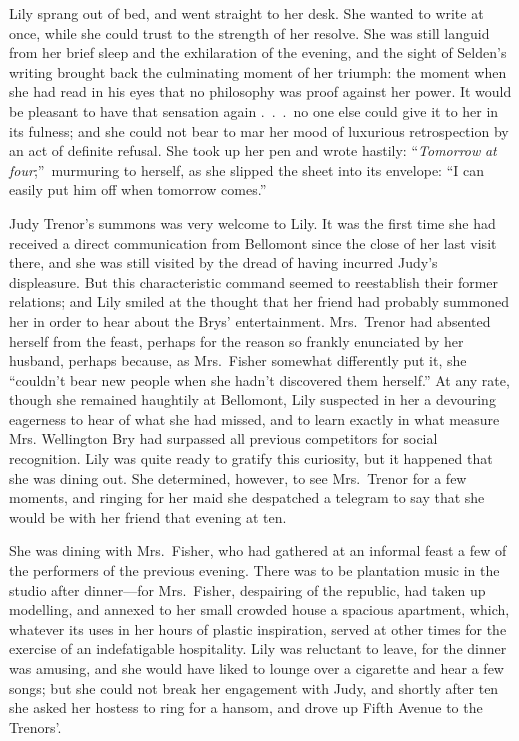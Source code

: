 \documentclass[12pt,a4paper]{book}
\begin{document}
Lily sprang out of bed, and went straight to her desk. She wanted
to write at once, while she could trust to the strength of her
resolve. She was still languid from her brief sleep and the
exhilaration of the evening, and the sight of Selden's writing
brought back the culminating moment of her triumph: the moment
when she had read in his eyes that no philosophy was proof
against her power. It would be pleasant to have that sensation
again .\ .\ .\ no one else could give it to her in its fulness; and
she could not bear to mar her mood of luxurious retrospection
by an act of definite refusal. She took up her pen and wrote hastily: 
``\textit{Tomorrow} \textit{at} \textit{four};''\ murmuring to herself, as she slipped the sheet
into its envelope: ``I can easily put him off when tomorrow comes.''







Judy Trenor's summons was very welcome to Lily. It was the first
time she had received a direct communication from Bellomont since
the close of her last visit there, and she was still visited by
the dread of having incurred Judy's displeasure. But this
characteristic command seemed to reestablish their former
relations; and Lily smiled at the thought that her friend had
probably summoned her in order to hear about the Brys'
entertainment. Mrs.\ Trenor had absented herself from the feast,
perhaps for the reason so frankly enunciated by her husband,
perhaps because, as Mrs.\ Fisher somewhat differently put it, she
``couldn't bear new people when she hadn't discovered them
herself.'' At any rate, though she remained haughtily at
Bellomont, Lily suspected in her a devouring eagerness to hear of
what she had missed, and to learn exactly in what measure Mrs.
Wellington Bry had surpassed all previous competitors for social
recognition. Lily was quite ready to gratify this curiosity, but
it happened that she was dining out. She determined, however, to
see Mrs.\ Trenor for a few moments, and ringing for her maid she
despatched a telegram to say that she would be with her friend
that evening at ten.





She was dining with Mrs.\ Fisher, who had gathered at an informal
feast a few of the performers of the previous evening. There was
to be plantation music in the studio after dinner---for Mrs.\ Fisher,
despairing of the republic, had taken up modelling, and annexed to
her small crowded house a spacious apartment, which, whatever its
uses in her hours of plastic inspiration, served at other times
for the exercise of an indefatigable hospitality. Lily was
reluctant to leave, for the dinner was amusing, and she would have
liked to lounge over a cigarette and hear a few songs; but she
could not break her engagement with Judy, and shortly after ten
she asked her hostess to ring for a hansom, and drove up Fifth
Avenue to the Trenors'.
\end{document}
